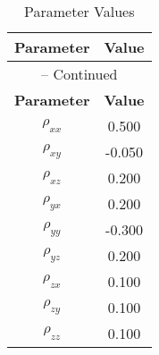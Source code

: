 \begin{center}
\begin{longtable}{cc}
\caption{Parameter Values}\\%
\toprule%
\multicolumn{1}{c}{\textbf{Parameter}} &
\multicolumn{1}{c}{\textbf{Value}}  \\%
\midrule%
\endfirsthead
\multicolumn{2}{c}{{\tablename} \thetable{} -- Continued}\\%
\midrule%
\multicolumn{1}{c}{\textbf{Parameter}} &
\multicolumn{1}{c}{\textbf{Value}} \\%
\midrule%
\endhead
$\rho_{xx}$ 	 & 	 0.500 \\
$\rho_{xy}$ 	 & 	 -0.050 \\
$\rho_{xz}$ 	 & 	 0.200 \\
$\rho_{yx}$ 	 & 	 0.200 \\
$\rho_{yy}$ 	 & 	 -0.300 \\
$\rho_{yz}$ 	 & 	 0.200 \\
$\rho_{zx}$ 	 & 	 0.100 \\
$\rho_{zy}$ 	 & 	 0.100 \\
$\rho_{zz}$ 	 & 	 0.100 \\
\bottomrule%
\end{longtable}
\end{center}
